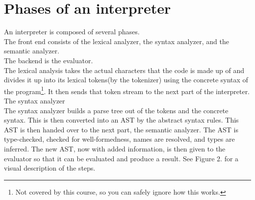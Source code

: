 \section{Phases of an interpreter}
An interpreter is composed of several phases. \\
The front end consists of the lexical analyzer, the syntax analyzer, and the semantic analyzer.\\
The backend is the evaluator.\\
The \gls{lexical analysis} takes the actual characters that the code is made up of and divides it up into its lexical tokens(by the tokenizer) using the concrete syntax of the program\footnote{Not covered by this course, so you can safely ignore how this works.}. 
It then sends that token stream to the next part of the interpreter. The \gls{syntax analyzer}\\
The syntax analyzer builds a parse tree out of the tokens and the concrete syntax. This is then converted into an AST by the abstract syntax rules. This AST is then handed over to the next part, the \gls{semantic analyzer}.
The AST is type-checked, checked for well-formedness, names are resolved, and types are inferred. The new AST, now with added information, is then given to the evaluator so that it can be evaluated and produce a result.
See Figure 2. for a visual description of the steps.
